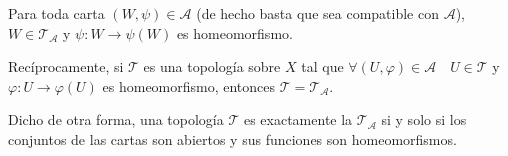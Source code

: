 \documentclass[../VD.tex]{subfiles}
\begin{document}
\begin{lemma}
  Para toda carta \((W,\psi) \in \mathcal{A}\) (de hecho basta que sea
  compatible con \(\mathcal{A}\)), \(W \in
  \mathcal{T}_{\mathcal{A}}\) y \(\psi \colon W \to \psi(W)\) es homeomorfismo.

  Recíprocamente, si \(\mathcal{T}\) es una topología sobre \(X\) tal que
  \(\forall (U,\varphi) \in \mathcal{A} \quad U \in \mathcal{T}\) y \(\varphi
  \colon U \to \varphi(U)\) es homeomorfismo, entonces \(\mathcal{T} =
  \mathcal{T}_{\mathcal{A}}\).

  Dicho de otra forma, una topología \(\mathcal{T}\) es exactamente la
   \(\mathcal{T}_{\mathcal{A}}\) si y solo si los conjuntos
  de las cartas son abiertos y sus funciones son homeomorfismos.
\end{lemma}
\end{document}
